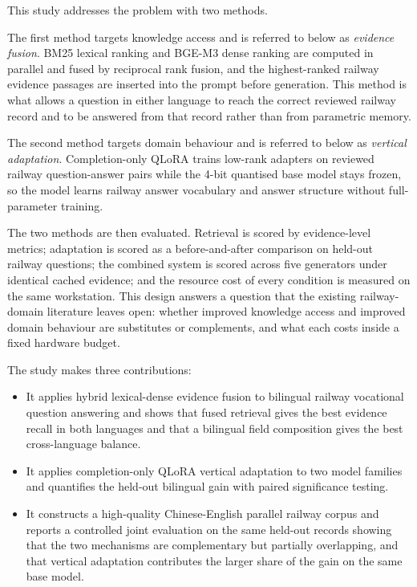 \documentclass{article}
\begin{document}
This study addresses the problem with two methods.

The first method targets knowledge access and is referred to below as \emph{evidence fusion}. BM25 lexical ranking and BGE-M3 dense ranking are computed in parallel and fused by reciprocal rank fusion, and the highest-ranked railway evidence passages are inserted into the prompt before generation. This method is what allows a question in either language to reach the correct reviewed railway record and to be answered from that record rather than from parametric memory.

The second method targets domain behaviour and is referred to below as \emph{vertical adaptation}. Completion-only QLoRA trains low-rank adapters on reviewed railway question-answer pairs while the 4-bit quantised base model stays frozen, so the model learns railway answer vocabulary and answer structure without full-parameter training.

The two methods are then evaluated. Retrieval is scored by evidence-level metrics; adaptation is scored as a before-and-after comparison on held-out railway questions; the combined system is scored across five generators under identical cached evidence; and the resource cost of every condition is measured on the same workstation. This design answers a question that the existing railway-domain literature leaves open: whether improved knowledge access and improved domain behaviour are substitutes or complements, and what each costs inside a fixed hardware budget.

The study makes three contributions:

\begin{itemize}
\item It applies hybrid lexical-dense evidence fusion to bilingual railway vocational question answering and shows that fused retrieval gives the best evidence recall in both languages and that a bilingual field composition gives the best cross-language balance.
\item It applies completion-only QLoRA vertical adaptation to two model families and quantifies the held-out bilingual gain with paired significance testing.
\item It constructs a high-quality Chinese-English parallel railway corpus and reports a controlled joint evaluation on the same held-out records showing that the two mechanisms are complementary but partially overlapping, and that vertical adaptation contributes the larger share of the gain on the same base model.
\end{itemize}
\end{document}
